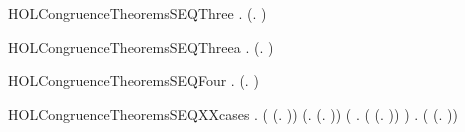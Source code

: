 \begin{SaveVerbatim}{HOLCongruenceTheoremsSEQThree}
\HOLTokenTurnstile{} \HOLSymConst{\HOLTokenForall{}} .   \HOLSymConst{\HOLTokenImp{}}  (\HOLTokenLambda{}.  )
\end{SaveVerbatim}
\newcommand{\HOLCongruenceTheoremsSEQThree}{\UseVerbatim{HOLCongruenceTheoremsSEQThree}}
\begin{SaveVerbatim}{HOLCongruenceTheoremsSEQThreea}
\HOLTokenTurnstile{} \HOLSymConst{\HOLTokenForall{}}.  (\HOLTokenLambda{}. )
\end{SaveVerbatim}
\newcommand{\HOLCongruenceTheoremsSEQThreea}{\UseVerbatim{HOLCongruenceTheoremsSEQThreea}}
\begin{SaveVerbatim}{HOLCongruenceTheoremsSEQFour}
\HOLTokenTurnstile{} \HOLSymConst{\HOLTokenForall{}} .   \HOLSymConst{\HOLTokenConj{}}   \HOLSymConst{\HOLTokenImp{}}  (\HOLTokenLambda{}.   \HOLSymConst{\ensuremath{+}}  )
\end{SaveVerbatim}
\newcommand{\HOLCongruenceTheoremsSEQFour}{\UseVerbatim{HOLCongruenceTheoremsSEQFour}}
\begin{SaveVerbatim}{HOLCongruenceTheoremsSEQXXcases}
\HOLTokenTurnstile{} \HOLSymConst{\HOLTokenForall{}}.
         \HOLSymConst{\HOLTokenEquiv{}}
       ( \HOLSymConst{=} (\HOLTokenLambda{}. )) \HOLSymConst{\HOLTokenDisj{}} (\HOLSymConst{\HOLTokenExists{}}.  \HOLSymConst{=} (\HOLTokenLambda{}. )) \HOLSymConst{\HOLTokenDisj{}}
       (\HOLSymConst{\HOLTokenExists{}} . ( \HOLSymConst{=} (\HOLTokenLambda{}.  )) \HOLSymConst{\HOLTokenConj{}}  ) \HOLSymConst{\HOLTokenDisj{}}
       \HOLSymConst{\HOLTokenExists{}} . ( \HOLSymConst{=} (\HOLTokenLambda{}.   \HOLSymConst{\ensuremath{+}}  )) \HOLSymConst{\HOLTokenConj{}}   \HOLSymConst{\HOLTokenConj{}}  
\end{SaveVerbatim}
